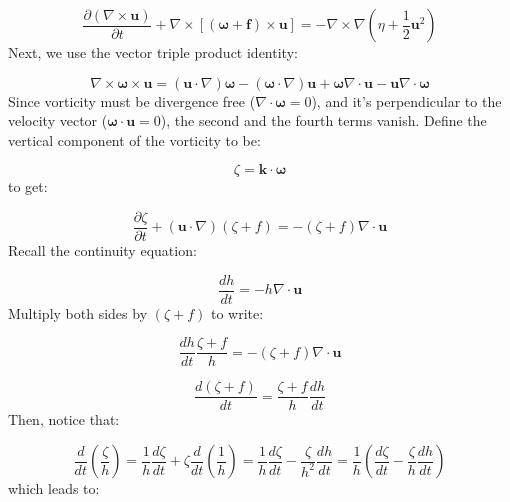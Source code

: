 \documentclass[12pt]{article}
\numberwithin{equation}{section}
\numberwithin{figure}{section}
\numberwithin{table}{section}
\begin{document}
\begin{equation}
  \frac{\partial (\nabla \times \mathbf{u})}{\partial t} +
  \nabla \times \left[(\boldsymbol{\omega} + \mathbf{f}) \times \mathbf{u}\right] =
  - \nabla \times \nabla \left(\eta + \frac{1}{2} \mathbf{u}^2 \right)
\end{equation}
Next, we use the vector triple product identity:

\begin{equation}
  \nabla \times \boldsymbol{\omega} \times \mathbf{u} =
  (\mathbf{u} \cdot \nabla) \boldsymbol{\omega} -
  (\boldsymbol{\omega} \cdot \nabla) \mathbf{u} +
  \boldsymbol{\omega} \nabla \cdot \mathbf{u} -
  \mathbf{u} \nabla \cdot \boldsymbol{\omega}
\end{equation}
Since vorticity must be divergence free ($\nabla \cdot \boldsymbol{\omega} = 0$),
and it's perpendicular to the velocity vector ($\boldsymbol{\omega} \cdot \mathbf{u} = 0$),
the second and the fourth terms vanish.
Define the vertical component of the vorticity to be:

\begin{equation}
  \zeta = \mathbf{k} \cdot \boldsymbol{\omega}
\end{equation}
to get:

\begin{equation}
  \frac{\partial \zeta}{\partial t} +
  \left(\mathbf{u} \cdot \nabla \right) \left(\zeta + f\right) =
  - \left(\zeta + f\right) \nabla \cdot \mathbf{u}
\end{equation}
Recall the continuity equation:

\begin{equation}
  \frac{dh}{dt} = -h \nabla \cdot \mathbf{u}
\end{equation}
Multiply both sides by $(\zeta + f)$ to write:

\begin{equation}
  \frac{dh}{dt} \frac{\zeta + f}{h} = - \left(\zeta + f\right) \nabla \cdot \mathbf{u}
\end{equation}

\begin{equation}
  \frac{d(\zeta + f)}{dt} = \frac{\zeta + f}{h} \frac{dh}{dt}
\end{equation}
Then, notice that:

\begin{equation}
  \frac{d}{dt} \left( \frac{\zeta}{h} \right) =
  \frac{1}{h} \frac{d\zeta}{dt} +
  \zeta \frac{d}{dt} \left( \frac{1}{h} \right) =
  \frac{1}{h} \frac{d\zeta}{dt} -
  \frac{\zeta}{h^2} \frac{dh}{dt} =
  \frac{1}{h} \left( \frac{d\zeta}{dt} - \frac{\zeta}{h} \frac{dh}{dt} \right)
\end{equation}
which leads to:
\end{document}
